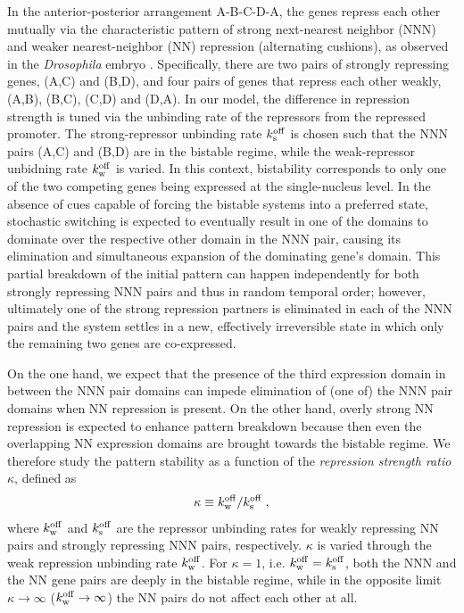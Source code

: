 \documentclass[a4paper,10pt]{article}
\newcommand{\Drosophila}{{\it Drosophila}\xspace}
\newcommand{\GA}{A\xspace}
\newcommand{\GB}{B\xspace}
\newcommand{\GC}{C\xspace}
\newcommand{\GD}{D\xspace}
\newcommand{\kRoffS}{k_{\rm s}^{\rm off}}
\newcommand{\kRoffW}{k_{\rm w}^{\rm off}}
\begin{document}
In the anterior-posterior arrangement \GA-\GB-\GC-\GD-\GA, the genes repress each other mutually via the characteristic pattern of strong next-nearest neighbor (NNN) and weaker nearest-neighbor (NN) repression (alternating cushions), as observed in the \Drosophila embryo \cite{Vakulenko2009, Jaeger2004, Clyde2003, Kraut1991a, Kraut1991b, Eldon1991, Hulskamp1990, Jackle1986}.
Specifically, there are two pairs of strongly repressing genes, (\GA,\GC) and (\GB,\GD), and four pairs of genes that repress each other weakly, (\GA,\GB), (\GB,\GC), (\GC,\GD) and (\GD,\GA).
In our model, the difference in repression strength is tuned via the unbinding rate of the repressors from the repressed promoter.
The strong-repressor unbinding rate $\kRoffS$ is chosen such that the NNN pairs (\GA,\GC) and (\GB,\GD) are in the bistable regime, while the weak-repressor unbidning rate $\kRoffW$ is varied. In this context, bistability corresponds to only one of the two competing genes being expressed at the single-nucleus level.
In the absence of cues capable of forcing the bistable systems into a preferred state, stochastic switching is expected to eventually result in one of the domains to dominate over the respective other domain in the NNN pair, causing its elimination and simultaneous expansion of the dominating gene's domain. This partial breakdown of the initial pattern can happen independently for both strongly repressing NNN pairs and thus in random temporal order; however, ultimately one of the strong repression partners is eliminated in each of the NNN pairs and the system settles in a new, effectively irreversible state in which only the remaining two genes are co-expressed.

On the one hand, we expect that the presence of the third expression domain in between the NNN pair domains can impede elimination of (one of) the NNN pair domains when NN repression is present.
On the other hand, overly strong NN repression is expected to enhance pattern breakdown because then even the overlapping NN expression domains are brought towards the bistable regime.
We therefore study the pattern stability as a function of the \emph{repression strength ratio} $\kappa$, defined as
\begin{align}
 \kappa \equiv \kRoffW / \kRoffS	\;,
 \label{Eq-kappa}
\end{align}
where $\kRoffW$ and $\kRoffS$ are the repressor unbinding rates for weakly repressing NN pairs and strongly repressing NNN pairs, respectively. $\kappa$ is varied through the weak repression unbinding rate $\kRoffW$. For $\kappa = 1$, i.e. $\kRoffW = \kRoffS$, both the NNN and the NN gene pairs are deeply in the bistable regime, while in the opposite limit $\kappa \rightarrow \infty$ ($\kRoffW \rightarrow \infty$) the NN pairs do not affect each other at all.
\end{document}
